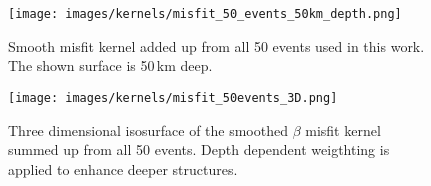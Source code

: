 \begin{figure}[h]
\begin{center}
\texttt{[image: images/kernels/misfit\_50\_events\_50km\_depth.png]}
\caption[Smooth misfit kernel for 50 events.]{Smooth misfit kernel added up from
all 50 events used in this work. The shown surface is 50$\,$km deep.}  
\label{misfit_50}
\end{center}
\end{figure}



\begin{figure}[h]
\begin{center}
\texttt{[image: images/kernels/misfit\_50events\_3D.png]}
\caption[3D isosurface of a misfit kernel for 50 events.]{Three dimensional isosurface of the smoothed $\beta$ 
misfit kernel summed up from all 50 events. Depth dependent weigthting is applied to enhance deeper structures.
}  
\label{3d_misfit_50}
\end{center}
\end{figure}